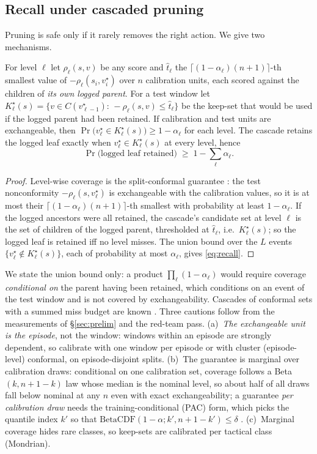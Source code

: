 \subsection{Recall under cascaded pruning}
Pruning is safe only if it rarely removes the right action. We give two mechanisms.
\begin{proposition}\label{prop:conformal}
For level $\ell$ let $\rho_\ell(s,v)$ be any score and $\hat t_\ell$ the $\lceil(1-\alpha_\ell)(n+1)\rceil$-th smallest value of
$-\rho_\ell(s_i,v_i^\star)$ over $n$ calibration units, each scored against the children of \emph{its own logged parent}. For a test window let
$K^\star_\ell(s)=\{v\in C(v^\star_{\ell-1}):\,-\rho_\ell(s,v)\le\hat t_\ell\}$ be the keep-set that would be used if the logged parent had been retained.
If calibration and test units are exchangeable, then $\Pr\big(v_\ell^\star\in K^\star_\ell(s)\big)\ge 1-\alpha_\ell$ for each level. The cascade retains the logged leaf exactly when
$v^\star_\ell\in K^\star_\ell(s)$ at every level, hence
\begin{equation}
\Pr\big(\text{logged leaf retained}\big)\;\ge\;1-\sum_{\ell}\alpha_\ell .\label{eq:recall}
\end{equation}
\end{proposition}
\begin{proof}
Level-wise coverage is the split-conformal guarantee \citep{angelopoulos2021gentle}: the test nonconformity $-\rho_\ell(s,v^\star_\ell)$ is exchangeable with the calibration values, so it is at most their $\lceil(1-\alpha_\ell)(n+1)\rceil$-th smallest with probability at least $1-\alpha_\ell$.
If the logged ancestors were all retained, the cascade's candidate set at level $\ell$ is the set of children of the logged parent, thresholded at $\hat t_\ell$, i.e.\ $K^\star_\ell(s)$; so the logged leaf is retained iff no level misses.
The union bound over the $L$ events $\{v^\star_\ell\notin K^\star_\ell(s)\}$, each of probability at most $\alpha_\ell$, gives \eqref{eq:recall}.\qedhere
\end{proof}
\noindent We state the union bound only: a product $\prod_\ell(1-\alpha_\ell)$ would require coverage \emph{conditional on} the parent having been retained, which conditions on an event of the test window and is not covered by exchangeability. Cascades of conformal sets with a summed miss budget are known \citep{fisch2021cascade}.
Three cautions follow from the measurements of \S\ref{sec:prelim} and the red-team pass. (a)~\emph{The exchangeable unit is the episode}, not the window: windows within an episode are strongly dependent, so calibrate with one window per episode or with cluster (episode-level) conformal, on episode-disjoint splits. (b)~The guarantee is marginal over calibration draws: conditional on one calibration set, coverage follows a Beta$(k,n{+}1{-}k)$ law whose median is the nominal level, so about half of all draws fall below nominal at any $n$ even with exact exchangeability; a guarantee \emph{per calibration draw} needs the training-conditional (PAC) form, which picks the quantile index $k'$ so that $\mathrm{BetaCDF}(1{-}\alpha;k',n{+}1{-}k')\le\delta$ \citep{vovk2012conditional}. (c)~Marginal coverage hides rare classes, so keep-sets are calibrated per tactical class (Mondrian).

